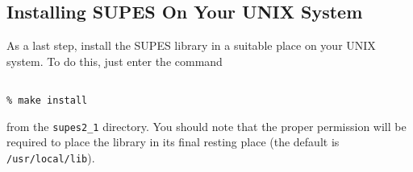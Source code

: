 \subsection{Installing SUPES On Your UNIX System}
As a last step,
install the SUPES library in a suitable place on your UNIX system.
To do this,
just enter the command
\begin{verbatim}

% make install

\end{verbatim}
from the \verb+supes2_1+ directory.
You should note that the proper permission will
be required to place the library in its final
resting place (the default is \verb+/usr/local/lib+).
